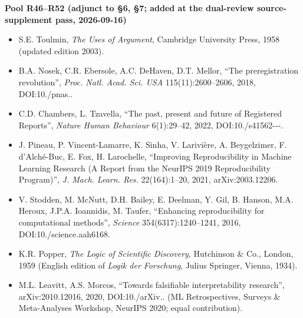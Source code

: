 \documentclass[11pt,a4paper]{article}
\begin{document}
\medskip
\noindent\textbf{Pool R46–R52 (adjunct to §6, §7; added at the dual-review source-supplement pass, 2026-09-16)}\par\addvspace{2pt}

\begin{itemize}[leftmargin=1.6em,itemsep=2pt,parsep=0pt,topsep=3pt]
\item[R46.] S.E. Toulmin, \textit{The Uses of Argument}, Cambridge University Press, 1958 (updated edition 2003).
\item[R47.] B.A. Nosek, C.R. Ebersole, A.C. DeHaven, D.T. Mellor, ``The preregistration revolution'', \textit{Proc. Natl. Acad. Sci. USA} 115(11):2600–2606, 2018, DOI:10./\allowbreak pnas..\allowbreak 
\item[R48.] C.D. Chambers, L. Tzavella, ``The past, present and future of Registered Reports'', \textit{Nature Human Behaviour} 6(1):29–42, 2022, DOI:10./\allowbreak s41562---.\allowbreak 
\item[R49.] J. Pineau, P. Vincent-Lamarre, K. Sinha, V. Larivière, A. Beygelzimer, F. d'Alché-Buc, E. Fox, H. Larochelle, ``Improving Reproducibility in Machine Learning Research (A Report from the NeurIPS 2019 Reproducibility Program)'', \textit{J. Mach. Learn. Res.} 22(164):1–20, 2021, arXiv:2003.12206.
\item[R50.] V. Stodden, M. McNutt, D.H. Bailey, E. Deelman, Y. Gil, B. Hanson, M.A. Heroux, J.P.A. Ioannidis, M. Taufer, ``Enhancing reproducibility for computational methods'', \textit{Science} 354(6317):1240–1241, 2016, DOI:10./\allowbreak science.\allowbreak aah6168.\allowbreak 
\item[R51.] K.R. Popper, \textit{The Logic of Scientific Discovery}, Hutchinson \& Co., London, 1959 (English edition of \textit{Logik der Forschung}, Julius Springer, Vienna, 1934).
\item[R52.] M.L. Leavitt, A.S. Morcos, ``Towards falsifiable interpretability research'', arXiv:2010.12016, 2020, DOI:10./\allowbreak arXiv.. (ML Retrospectives, Surveys \& Meta-Analyses Workshop, NeurIPS 2020; equal contribution).
\end{itemize}
\end{document}
